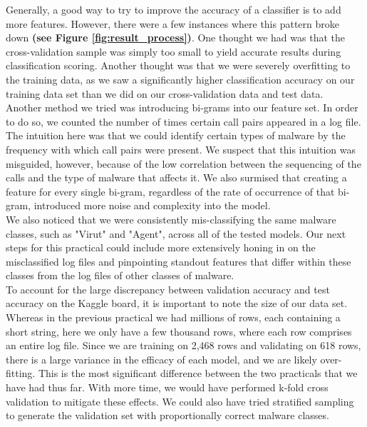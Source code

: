 \documentclass[11pt]{article}
\begin{document}
Generally, a good way to try to improve the accuracy of a classifier is to add more features. However, there were a few instances where this pattern broke down \textbf{(see Figure \ref{fig:result_process})}. One thought we had was that the cross-validation sample was simply too small to yield accurate results during classification scoring. Another thought was that we were severely overfitting to the training data, as we saw a significantly higher classification accuracy on our training data set than we did on our cross-validation data and test data.\\

Another method we tried was introducing bi-grams into our feature set. In order to do so, we counted the number of times certain call pairs appeared in a log file. The intuition here was that we could identify certain types of malware by the frequency with which call pairs were present. We suspect that this intuition was misguided, however, because of the low correlation between the sequencing of the calls and the type of malware that affects it. We also surmised that creating a feature for every single bi-gram, regardless of the rate of occurrence of that bi-gram, introduced more noise and complexity into the model. \\

We also noticed that we were consistently mis-classifying the same malware classes, such as "Virut" and "Agent", across all of the tested models. Our next steps for this practical could include more extensively honing in on the misclassified log files and pinpointing standout features that differ within these classes from the log files of other classes of malware.\\

To account for the large discrepancy between validation accuracy and test accuracy on the Kaggle board, it is important to note the size of our data set. Whereas in the previous practical we had millions of rows, each containing a short string, here we only have a few thousand rows, where each row comprises an entire log file. Since we are training on 2,468 rows and validating on 618 rows, there is a large variance in the efficacy of each model, and we are likely over-fitting. This is the most significant difference between the two practicals that we have had thus far. With more time, we would have performed k-fold cross validation to mitigate these effects. We could also have tried stratified sampling to generate the validation set with proportionally correct malware classes.\\
\end{document}
